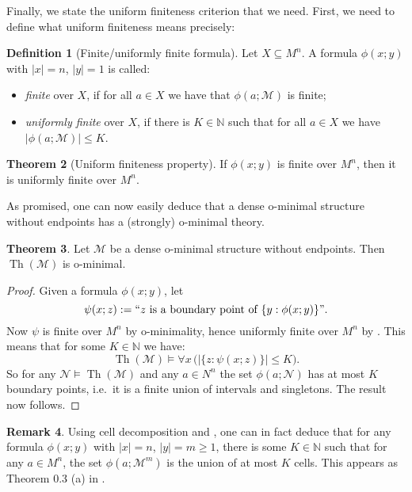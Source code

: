 \documentclass[a4paper]{report}
\newcommand{\ind}{\hspace{15pt}}
\newcommand{\Nat}{\mathbb{N}}
\newcommand{\M}{\mathcal{M}}
\newcommand{\N}{\mathcal{N}}
\DeclareMathOperator{\Th}{Th}
\theoremstyle{definition}
\newtheorem{thm}{Theorem}[chapter]
\newtheorem{defn}[thm]{Definition}
\theoremstyle{remstyle}
\newtheorem{rem}[thm]{Remark}
\begin{document}
\ind Finally, we state the uniform finiteness criterion that we need. First, we need to define what uniform finiteness means precisely:

\begin{defn}[Finite/uniformly finite formula]
	Let $X\subseteq M^n$. A formula $\phi(x;y)$ with $|x|=n$, $|y|=1$ is called:
	\begin{itemize}
		\item \emph{finite} over $X$, if for all $a\in X$ we have that $\phi(a;\M)$ is finite;
		\item \emph{uniformly finite} over $X$, if there is $K\in\Nat$ such that for all $a\in X$ we have $|\phi(a;\M)|\leq K$.
	\end{itemize}
\end{defn}

\begin{thm}[Uniform finiteness property]\label{unifinite}
	If $\phi(x;y)$ is finite over $M^n$, then it is uniformly finite over $M^n$.
\end{thm}

\ind As promised, one can now easily deduce that a dense o-minimal structure without endpoints has a (strongly) o-minimal theory.

\begin{thm}\label{strongdense}
	Let $\M$ be a dense o-minimal structure without endpoints. Then $\Th(\M)$ is o-minimal.
\end{thm}

\begin{proof}
	Given a formula $\phi(x;y)$, let
	\begin{equation*}
		\psi(x;z):= ``z\ \text{is a boundary point of}\ \{y:\phi(x;y)\}".
	\end{equation*}
	Now $\psi$ is finite over $M^n$ by o-minimality, hence uniformly finite over $M^n$ by . This means that for some $K\in\Nat$ we have:
	\begin{equation*}
		\Th(\M) \models \forall x\,\big(|\{z:\psi(x;z)\}|\leq K\big).
	\end{equation*}
	So for any $\N\models\Th(\M)$ and any $a\in N^n$ the set $\phi(a;\N)$ has at most $K$ boundary points, i.e.\ it is a finite union of intervals and singletons. The result now follows.
\end{proof}

\begin{rem}
	Using cell decomposition and , one can in fact deduce that for any formula $\phi(x;y)$ with $|x|=n$, $|y|=m\geq 1$, there is some $K\in\Nat$ such that for any $a\in M^n$, the set $\phi(a;\M^m)$ is the union of at most $K$ cells. This appears as Theorem 0.3 (a) in \cite{defII}.
\end{rem}
\end{document}
